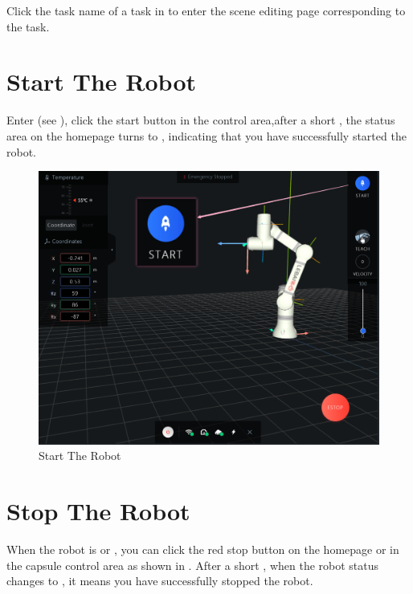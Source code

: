 Click the task name of a task in  to enter the scene editing page corresponding to the task.



\section{Start The Robot}
Enter \LM (see ), click the start button in the control area,after a short , the status area on the homepage turns to , indicating that you have successfully started the robot.

\begin{figure}[ht]
	\centering
	\includegraphics[width=\textwidth]{en/image/2-16.png}
	\caption{Start The Robot}
	\label{fig:启动机器人}
\end{figure}

\section{Stop The Robot}
When the robot is  or , you can click the red stop button on the homepage or in the capsule control area as shown in . After a short , when the robot status changes to , it means you have successfully stopped the robot.

